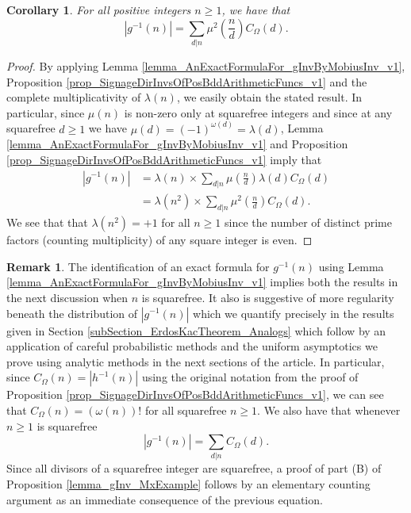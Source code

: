 \documentclass[11pt,reqno,a4letter]{article}
\numberwithin{figure}{section}
\numberwithin{table}{section}
\theoremstyle{plain}
\newtheorem{cor}[theorem]{Corollary}
\numberwithin{theorem}{section}
\theoremstyle{definition}
\newtheorem{remark}[theorem]{Remark}
\begin{document}
\begin{cor} 
\label{lemma_AbsValueOf_gInvn_FornSquareFree_v1} 
For all positive integers $n \geq 1$, we have that 
\begin{equation} 
\label{eqn_AbsValueOf_gInvn_FornSquareFree_v1} 
|g^{-1}(n)| = \sum_{d|n} \mu^2\left(\frac{n}{d}\right) C_{\Omega}(d). 
\end{equation} 
\end{cor} 
\begin{proof} 
By applying 
Lemma \ref{lemma_AnExactFormulaFor_gInvByMobiusInv_v1}, 
Proposition \ref{prop_SignageDirInvsOfPosBddArithmeticFuncs_v1} and the 
complete multiplicativity of $\lambda(n)$, 
we easily obtain the stated result. 
In particular, since $\mu(n)$ is non-zero only at squarefree integers and since 
at any squarefree $d \geq 1$ we have $\mu(d) = (-1)^{\omega(d)} = \lambda(d)$, 
Lemma \ref{lemma_AnExactFormulaFor_gInvByMobiusInv_v1} and 
Proposition \ref{prop_SignageDirInvsOfPosBddArithmeticFuncs_v1} imply that  
\begin{align*} 
|g^{-1}(n)| & = \lambda(n) \times \sum_{d|n} \mu\left(\frac{n}{d}\right) \lambda(d) C_{\Omega}(d) \\ 
     & = \lambda(n^2) \times \sum_{d|n} \mu^2\left(\frac{n}{d}\right) C_{\Omega}(d). 
\end{align*} 
We see that 
that $\lambda(n^2) = +1$ for all $n \geq 1$ since the number of distinct 
prime factors (counting multiplicity) of any square integer is even. 
\end{proof} 

\begin{remark} 
\label{remark_COmegann_AtSquareFreeIntegers_v3} 
The identification of an exact formula for $g^{-1}(n)$ using 
Lemma \ref{lemma_AnExactFormulaFor_gInvByMobiusInv_v1} 
implies both the results in the next discussion when $n$ is squarefree. 
It also is suggestive of more regularity beneath the 
distribution of $|g^{-1}(n)|$ which we quantify precisely in the results given in 
Section \ref{subSection_ErdosKacTheorem_Analogs} which follow by an application of careful 
probabilistic methods and the uniform asymptotics we prove 
using analytic methods in the next sections of the article. 
In particular, since $C_{\Omega}(n) = |h^{-1}(n)|$ using the original 
notation from the proof of 
Proposition \ref{prop_SignageDirInvsOfPosBddArithmeticFuncs_v1}, we can see that 
$C_{\Omega}(n) = (\omega(n))!$ for all squarefree $n \geq 1$. 
We also have that whenever $n \geq 1$ is squarefree 
\[
|g^{-1}(n)| = \sum_{d|n} C_{\Omega}(d). 
\]
Since all divisors of a squarefree integer are squarefree, 
a proof of part (B) of Proposition \ref{lemma_gInv_MxExample} 
follows by an elementary counting argument as an immediate consequence 
of the previous equation. 
\end{remark}
\end{document}
